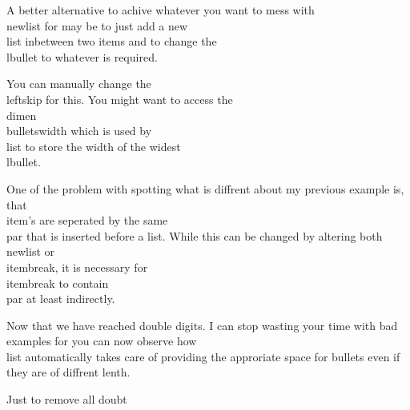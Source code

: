 {{  \item{A better alternative to achive whatever you want to mess with {\cs\\newlist} for may be to just add a new {\cs\\list} inbetween two items and to change the {\cs\\lbullet} to whatever is required.}
  \item{You can manually change the {\cs\\leftskip} for this. You might want to access the {\cs\\dimen} {\cs\\bulletswidth} which is used by {\cs\\list} to store the width of the widest {\cs\\lbullet}.}
  {\advance\leftskip\bulletswidth{}}
  \item{One of the problem with spotting what is diffrent about my previous example is, that {\cs\\item}'s are seperated by the same {\cs\\par} that is inserted before a list. While this can be changed by altering both {\cs\\newlist} or {\cs\\itembreak}, it is necessary for {\cs\\itembreak } to contain {\cs\\par} at least indirectly.}
  \item{Now that we have reached double digits. I can stop wasting your time with bad examples for you can now observe how {\cs\\list} automatically takes care of providing the approriate space for bullets even if they are of diffrent lenth.}
  {\def\lbullet{$\circ\quad$}
  \item{Just to remove all doubt}}}}
